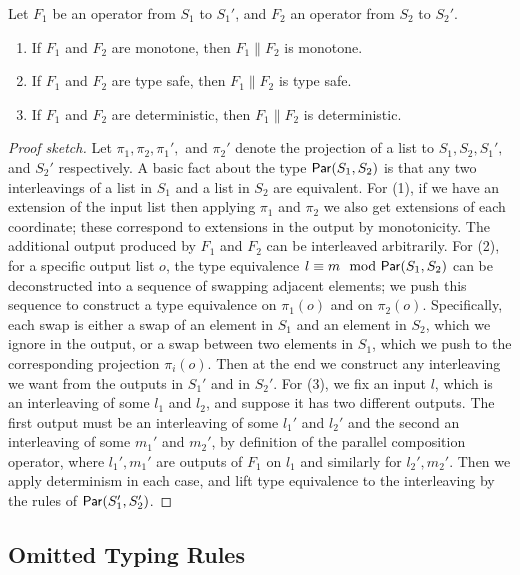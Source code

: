 \begin{proposition}
Let $F_1$ be an operator from $S_1$ to $S_1'$, and $F_2$ an operator from $S_2$ to $S_2'$.
\begin{enumerate}
  \item If $F_1$ and $F_2$ are monotone, then $F_1 \| F_2$ is monotone.
  \item If $F_1$ and $F_2$ are type safe, then $F_1 \| F_2$ is type safe.
  \item If $F_1$ and $F_2$ are deterministic, then $F_1 \| F_2$ is deterministic.
\end{enumerate}
\end{proposition}
\begin{proof}[Proof sketch]
Let $\pi_1, \pi_2, \pi_1',$ and $\pi_2'$ denote the projection of a list to $S_1, S_2, S_1',$ and $S_2'$ respectively.
A basic fact about the type $\mathsf{Par}({S_1}, {S_2})$ is that any two interleavings of a list in $S_1$ and a list in $S_2$ are equivalent.
For (1), if we have an extension of the input list then applying $\pi_1$ and $\pi_2$ we also get extensions of each coordinate; these correspond to extensions in the output by monotonicity. The additional output produced by $F_1$ and $F_2$ can be interleaved arbitrarily.
For (2), for a specific output list $o$, the type equivalence $l \equiv m \mod {\mathsf{Par}({S_1}, {S_2})}$
can be deconstructed into a sequence of swapping adjacent elements; we push this sequence to construct a type equivalence on $\pi_1(o)$ and on $\pi_2(o)$. Specifically, each swap is either a swap of an element in $S_1$ and an element in $S_2$, which we ignore in the output, or a swap between two elements in $S_1$, which we push to the corresponding projection $\pi_i(o)$.
Then at the end we construct any interleaving we want from the outputs in $S_1'$ and in $S_2'$.
For (3), we fix an input $l$, which is an interleaving of some $l_1$ and $l_2$,
and suppose it has two different outputs.
The first output must be an interleaving of some $l_1'$ and $l_2'$ and the second an interleaving of some $m_1'$ and $m_2'$, by definition of the parallel composition operator, where $l_1', m_1'$ are outputs of $F_1$ on $l_1$ and similarly for $l_2', m_2'$. Then we apply determinism in each case, and lift type equivalence to the interleaving by the rules of $\mathsf{Par}({S_1'}, {S_2'})$.
\end{proof}

\subsection{Omitted Typing Rules}
\label{omitted:typing}

